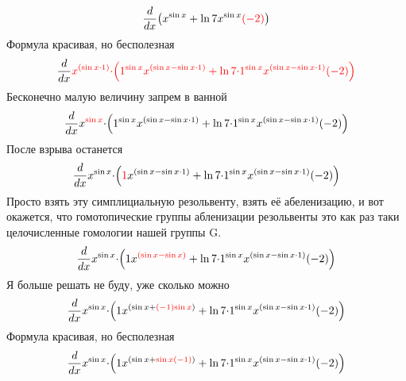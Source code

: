 \documentclass{article}
\begin{document}
\begin{center}
\begin{gather*}
{{\frac{{d}}{{d{{x}}}}}{{\left({{x}^{\sin{{x}}}}+{{\ln{{7}}}{{{x}^{\sin{{x}}}}{\color{red}{{\left(-{2}\right)}}}}}\right)}}}\end{gather*}
Формула красивая, но бесполезная\begin{gather*}
{{\frac{{d}}{{d{{x}}}}}{{\color{red}{{{{x}^{\left({\sin{{x}}}{\cdot}{1}\right)}}{\cdot}{\left({{{1}^{\sin{{x}}}}{{x}^{\left({\sin{{x}}}-{{\sin{{x}}}{\cdot}{1}}\right)}}}+{{\ln{{7}}}{\cdot}{{{{1}^{\sin{{x}}}}{{x}^{\left({\sin{{x}}}-{{\sin{{x}}}{\cdot}{1}}\right)}}}{\left(-{2}\right)}}}\right)}}}}}}\end{gather*}
Бесконечно малую величину запрем в ванной\begin{gather*}
{{\frac{{d}}{{d{{x}}}}}{{{{x}^{\color{red}{{\sin{{x}}}}}}{\cdot}{\left({{{1}^{\sin{{x}}}}{{x}^{\left({\sin{{x}}}-{{\sin{{x}}}{\cdot}{1}}\right)}}}+{{\ln{{7}}}{\cdot}{{{{1}^{\sin{{x}}}}{{x}^{\left({\sin{{x}}}-{{\sin{{x}}}{\cdot}{1}}\right)}}}{\left(-{2}\right)}}}\right)}}}}\end{gather*}
После взрыва останется\begin{gather*}
{{\frac{{d}}{{d{{x}}}}}{{{{x}^{\sin{{x}}}}{\cdot}{\left({{\color{red}{{1}}}{{x}^{\left({\sin{{x}}}-{{\sin{{x}}}{\cdot}{1}}\right)}}}+{{\ln{{7}}}{\cdot}{{{{1}^{\sin{{x}}}}{{x}^{\left({\sin{{x}}}-{{\sin{{x}}}{\cdot}{1}}\right)}}}{\left(-{2}\right)}}}\right)}}}}\end{gather*}
Просто взять эту симплициальную резольвенту, взять её абеленизацию, и вот окажется, что гомотопические группы абленизации резольвенты это как раз таки целочисленные гомологии нашей группы G.\begin{gather*}
{{\frac{{d}}{{d{{x}}}}}{{{{x}^{\sin{{x}}}}{\cdot}{\left({{1}{{x}^{\color{red}{{\left({\sin{{x}}}-{\sin{{x}}}\right)}}}}}+{{\ln{{7}}}{\cdot}{{{{1}^{\sin{{x}}}}{{x}^{\left({\sin{{x}}}-{{\sin{{x}}}{\cdot}{1}}\right)}}}{\left(-{2}\right)}}}\right)}}}}\end{gather*}
Я больше решать не буду, уже сколько можно\begin{gather*}
{{\frac{{d}}{{d{{x}}}}}{{{{x}^{\sin{{x}}}}{\cdot}{\left({{1}{{x}^{\left({\sin{{x}}}+{\color{red}{{{\left(-{1}\right)}{\sin{{x}}}}}}\right)}}}+{{\ln{{7}}}{\cdot}{{{{1}^{\sin{{x}}}}{{x}^{\left({\sin{{x}}}-{{\sin{{x}}}{\cdot}{1}}\right)}}}{\left(-{2}\right)}}}\right)}}}}\end{gather*}
Формула красивая, но бесполезная\begin{gather*}
{{\frac{{d}}{{d{{x}}}}}{{{{x}^{\sin{{x}}}}{\cdot}{\left({{1}{{x}^{\left({\sin{{x}}}+{\color{red}{{{\sin{{x}}}{\left(-{1}\right)}}}}\right)}}}+{{\ln{{7}}}{\cdot}{{{{1}^{\sin{{x}}}}{{x}^{\left({\sin{{x}}}-{{\sin{{x}}}{\cdot}{1}}\right)}}}{\left(-{2}\right)}}}\right)}}}}\end{gather*}

\end{center}
\end{document}
